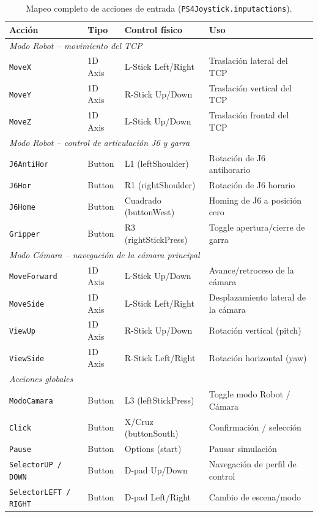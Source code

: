 \begin{table}[H]
\centering
\caption{Mapeo completo de acciones de entrada (\texttt{PS4Joystick.inputactions}).}
\label{tab:inputactions}
\begin{tabular}{llll}
\hline
\textbf{Acción} & \textbf{Tipo} & \textbf{Control físico} & \textbf{Uso} \\
\hline
\multicolumn{4}{l}{\textit{Modo Robot -- movimiento del TCP}} \\
\hline
\texttt{MoveX}       & 1D Axis & L-Stick Left/Right   & Traslación lateral del TCP \\
\texttt{MoveY}       & 1D Axis & R-Stick Up/Down      & Traslación vertical del TCP \\
\texttt{MoveZ}       & 1D Axis & L-Stick Up/Down      & Traslación frontal del TCP \\
\hline
\multicolumn{4}{l}{\textit{Modo Robot -- control de articulación J6 y garra}} \\
\hline
\texttt{J6AntiHor}   & Button  & L1 (leftShoulder)    & Rotación de J6 antihorario \\
\texttt{J6Hor}       & Button  & R1 (rightShoulder)   & Rotación de J6 horario \\
\texttt{J6Home}      & Button  & Cuadrado (buttonWest) & Homing de J6 a posición cero \\
\texttt{Gripper}     & Button  & R3 (rightStickPress) & Toggle apertura/cierre de garra \\
\hline
\multicolumn{4}{l}{\textit{Modo Cámara -- navegación de la cámara principal}} \\
\hline
\texttt{MoveForward} & 1D Axis & L-Stick Up/Down      & Avance/retroceso de la cámara \\
\texttt{MoveSide}    & 1D Axis & L-Stick Left/Right   & Desplazamiento lateral de la cámara \\
\texttt{ViewUp}      & 1D Axis & R-Stick Up/Down      & Rotación vertical (pitch) \\
\texttt{ViewSide}    & 1D Axis & R-Stick Left/Right   & Rotación horizontal (yaw) \\
\hline
\multicolumn{4}{l}{\textit{Acciones globales}} \\
\hline
\texttt{ModoCamara}  & Button  & L3 (leftStickPress)  & Toggle modo Robot / Cámara \\
\texttt{Click}       & Button  & X/Cruz (buttonSouth) & Confirmación / selección \\
\texttt{Pause}       & Button  & Options (start)      & Pausar simulación \\
\texttt{SelectorUP / DOWN} & Button & D-pad Up/Down  & Navegación de perfil de control \\
\texttt{SelectorLEFT / RIGHT} & Button & D-pad Left/Right & Cambio de escena/modo \\
\hline
\end{tabular}
\end{table}

